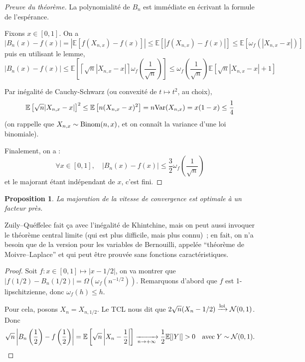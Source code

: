 \documentclass[a4paper, 11pt]{article}
\def\E{\mathbb{E}}
\def\Var{\textnormal{Var}}
\newtheorem*{proposition}{Proposition}
\begin{document}
\begin{proof}[Preuve du théorème]
  La polynomialité de $B_n$ est immédiate en écrivant la formule de l'espérance.

  Fixons $x \in [0,1]$. On a
  \[ |B_n(x) - f(x)| = \left| \E\left[ f(X_{n,x}) - f(x) \right] \right|
    \leq \E\left[ \left| f(X_{n,x}) - f(x) \right| \right]
    \leq \E[\omega_f(|X_{n,x} - x|)]\]
  puis en utilisant le lemme,
  \[ |B_n(x) - f(x)| \leq \E\left[ \left\lceil \sqrt{n} |X_{n,x} - x| \right\rceil
    \omega_f\left( \frac{1}{\sqrt{n}} \right) \right]
    \leq \omega_f\left( \frac{1}{\sqrt{n}} \right)
    \E\left[ \sqrt{n} |X_{n,x} - x| + 1 \right]\]

  Par inégalité de Cauchy-Schwarz (ou convexité de $t \mapsto t^2$, au choix),
  \[  \E\left[ \sqrt{n} |X_{n,x} - x| \right]^2 \leq
    \E\left[ n (X_{n,x} - x)^2 \right] = n \Var(X_{n,x}) = x(1-x) \leq \frac{1}{4} \]
  (on rappelle que $X_{n,x} \sim \textnormal{Binom}(n,x)$, et on connaît la
  variance d'une loi binomiale).

  Finalement, on a :
  \[ \forall x \in [0,1],\quad |B_n(x) - f(x)|
    \leq \frac{3}{2}  \omega_f\left( \frac{1}{\sqrt{n}} \right) \]
  et le majorant étant indépendant de $x$, c'est fini.
\end{proof}

\begin{proposition}
  La majoration de la vitesse de convergence est optimale à un facteur près.
\end{proposition}
Zuily--Quéffelec fait ça avec l'inégalité de Khintchine, mais on peut aussi
invoquer le théorème central limite (qui est plus difficile, mais plus connu)~;
en fait, on n'a besoin que de la version pour les variables de Bernouilli,
appelée \enquote{théorème de Moivre--Laplace} et qui peut être prouvée sans
fonctions caractéristiques.
\begin{proof}
  Soit $f : x \in [0,1] \mapsto |x - 1/2|$, on va montrer que $|f(1/2) -
  B_n(1/2)| = \Omega(\omega_f(n^{-1/2}))$. Remarquons d'abord que $f$ est
  1-lipschitzienne, donc $\omega_f(h) \leq h$.

  Pour cela, posons $X_n = X_{n,1/2}$.
  Le TCL nous dit que $2\sqrt{n}(X_n - 1/2)
  \xrightarrow{\textnormal{loi}} \mathcal{N}(0,1)$. Donc
  \[ \sqrt{n} \left| B_n\left( \frac{1}{2} \right) - f\left( \frac{1}{2} \right)
    \right| = \E\left[ \sqrt{n} \left| X_n - \frac{1}{2} \right| \right]
    \xrightarrow[n \to +\infty]{} \frac{1}{2} \E[|Y|] > 0 \quad
    \textnormal{avec}\; Y \sim \mathcal{N}(0,1).
  \]
\end{proof}
\end{document}
